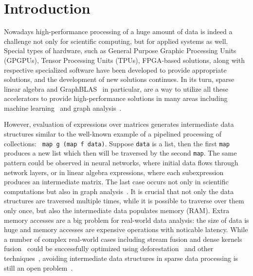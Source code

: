 \section{Introduction}

Nowadays high-performance processing of a huge amount of data is indeed a challenge not only for scientific computing, but for applied systems as well.
Special types of hardware, such as General Purpose Graphic Processing Units (GPGPUs), Tensor Processing Units (TPUs), FPGA-based solutions, along with respective specialized software have been developed to provide appropriate solutions, and the development of new solutions continues.
In its turn, sparse linear algebra and GraphBLAS~\cite{buluc2017graphblas} in particular, are a way to utilize all these accelerators to provide high-performance solutions in many areas including machine learning~\cite{Kepner2017} and graph analysis~\cite{graphblast}.


However, evaluation of expressions over matrices generates intermediate data structures similar to the well-known example of a pipelined processing of collections: \verb| map g (map f data)|. Suppose \verb|data| is a list, then the first \verb|map| produces a new list which then will be traversed by the second \verb|map|. The same pattern could be observed in neural networks, where initial data flows through network layers, or in linear algebra expressions, where each subexpression produces an intermediate matrix. 
The last case occurs not only in scientific computations but also in graph analysis~\cite{graphblast}.
It is crucial that not only the data structures are traversed multiple times, while it is possible to traverse over them only once, but also the intermediate data populates memory (RAM).
Extra memory accesses are a big problem for real-world data analysis: the size of data is huge and memory accesses are expensive operations with noticable latency.
While a number of complex real-world cases including stream fusion and dense kernels fusion~\cite{fusion-boosting-memory-computations} could be successfully optimized using deforestation~\cite{wadler-deforestation,wadler-deforestation-ho} and other techniques~, avoiding intermediate data structures in sparse data processing is still an open problem~\cite{graphblast}.
